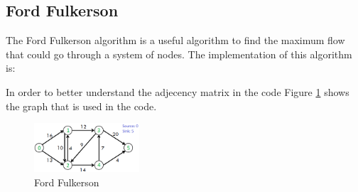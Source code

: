 \subsection{Ford Fulkerson}

The Ford Fulkerson algorithm is a useful algorithm to find the maximum flow that could go through a system of nodes. The implementation of this algorithm is:



In order to better understand the adjecency matrix in the code Figure \ref{fig:ford_fulkerson} shows the graph that is used in the code.

\begin{figure}[h]
\centering
\includegraphics[width=0.35\textwidth]{../Figures/ford_fulkerson11.png}
\caption{Ford Fulkerson}
\label{fig:ford_fulkerson}
\end{figure}
